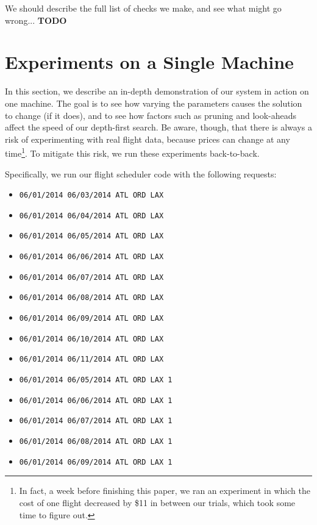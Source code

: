 \documentclass{article}
\begin{document}
We should describe the full list of checks we make, and see what might go wrong...
{\bf TODO}

\section{Experiments on a Single Machine}\label{app:single_machine_experiment}

In this section, we describe an in-depth demonstration of our system in action on one machine. The goal is to see how varying the parameters causes
the solution to change (if it does), and to see how factors such as pruning and look-aheads affect the speed of our depth-first search. Be aware,
though, that there is always a risk of experimenting with real flight data, because prices can change at any time\footnote{In fact, a week before
finishing this paper, we ran an experiment in which the cost of one flight decreased by \$11 in between our trials, which took some time to figure
out.}. To mitigate this risk, we run these experiments back-to-back.

Specifically, we run our flight scheduler code with the following requests:

\begin{itemize}[noitemsep]
    \item \texttt{06/01/2014 06/03/2014 ATL ORD LAX}
    \item \texttt{06/01/2014 06/04/2014 ATL ORD LAX}
    \item \texttt{06/01/2014 06/05/2014 ATL ORD LAX}
    \item \texttt{06/01/2014 06/06/2014 ATL ORD LAX}
    \item \texttt{06/01/2014 06/07/2014 ATL ORD LAX}
    \item \texttt{06/01/2014 06/08/2014 ATL ORD LAX}
    \item \texttt{06/01/2014 06/09/2014 ATL ORD LAX}
    \item \texttt{06/01/2014 06/10/2014 ATL ORD LAX}
    \item \texttt{06/01/2014 06/11/2014 ATL ORD LAX}
    \item \texttt{06/01/2014 06/05/2014 ATL ORD LAX 1}
    \item \texttt{06/01/2014 06/06/2014 ATL ORD LAX 1}
    \item \texttt{06/01/2014 06/07/2014 ATL ORD LAX 1}
    \item \texttt{06/01/2014 06/08/2014 ATL ORD LAX 1}
    \item \texttt{06/01/2014 06/09/2014 ATL ORD LAX 1}
\end{itemize}
\end{document}
